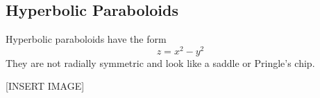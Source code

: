 \subsection{Hyperbolic Paraboloids}
\noindent
Hyperbolic paraboloids have the form
\begin{equation*}
	z = x^2 - y^2
\end{equation*} 
They are not radially symmetric and look like a saddle or Pringle's chip.

[INSERT IMAGE]